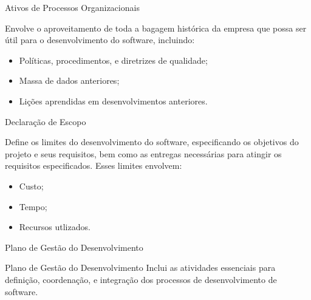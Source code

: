\documentclass[xcolor=x11names,compress]{beamer}
\begin{document}
\begin{frame}{Ativos de Processos Organizacionais}

Envolve o aproveitamento de toda a bagagem histórica da empresa que possa ser útil para o desenvolvimento do software, incluindo:

\begin{itemize}
\itemsep 5mm

\item Políticas, procedimentos, e diretrizes de qualidade;

\item Massa de dados anteriores;

\item Lições aprendidas em desenvolvimentos anteriores.

\end{itemize}

\end{frame}

\begin{frame}{Declaração de Escopo}

Define os limites do desenvolvimento do software, especificando os objetivos do projeto e seus requisitos, bem como as entregas necessárias para atingir os requisitos especificados. Esses limites envolvem:

\begin{itemize}
\itemsep 5mm

\item Custo;

\item Tempo;

\item Recursos utlizados.

\end{itemize}

\end{frame}

\begin{frame}{Plano de Gestão do Desenvolvimento}


\begin{alertblock}{Plano de Gestão do Desenvolvimento}
Inclui as atividades essenciais para definição, coordenação, e integração dos processos de desenvolvimento de software.
\end{alertblock}

\end{frame}
\end{document}
